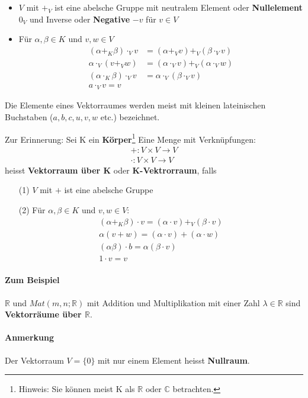 \documentclass[11pt]{report}
\newcommand*\Zb[1] {\mathbb{#1}}
\newcommand*\f[1] {\textbf{#1}}
\begin{document}
\begin{itemize}
 \item $V$ mit $+_V$ ist eine abelsche Gruppe mit neutralem Element oder \f{Nullelement} $0_V$ und Inverse oder \f{Negative} $-v$ für $v\in V$
 \item Für $\alpha, \beta \in K$ und $v, w \in V$
\begin{align}
 (\alpha+_K\beta)\cdot_V v &= (\alpha+_V v) +_V (\beta\cdot_V v) \\
 \alpha\cdot_V(v+_V w) &= (\alpha \cdot_V v)+_V (\alpha\cdot_V w) \\
 (\alpha\cdot_K \beta) \cdot_V v &= \alpha\cdot_V(\beta\cdot_V v) \\
 a \cdot_V v = v
\end{align}
\end{itemize}
Die Elemente eines Vektorraumes werden meist mit kleinen lateinischen Buchstaben ($a, b, c, u, v, w$ etc.) bezeichnet.

Zur Erinnerung: Sei K ein \f{Körper}\footnote{Hinweis: Sie können meist K als $\Zb{R}$ oder $\Zb{C}$ betrachten.} Eine Menge mit Verknüpfungen:
\begin{align}
 +: V \times V \rightarrow V \\
\cdot : V \times V \rightarrow V
\end{align}
heisst \f{Vektorraum über K} oder \f{K-Vektrorraum}, falls 
\begin{itemize}
 \item[(1)] $V$ mit $+$ ist eine abelsche Gruppe
 \item[(2)] Für $\alpha, \beta \in K$ und $v, w \in V$:
\begin{align}
 (\alpha +_K \beta)\cdot  v = (\alpha \cdot v) +_V (\beta \cdot v) \\
 \alpha (v+w) = (\alpha \cdot v) + (\alpha \cdot w) \\
(\alpha \beta) \cdot b = \alpha (\beta \cdot v) \\
1 \cdot v = v
\end{align}
\end{itemize}
\paragraph{Zum Beispiel} $\Zb{R}$ und $Mat(m, n; \Zb{R})$ mit Addition und Multiplikation mit einer Zahl $\lambda \in \Zb{R}$ sind \f{Vektorräume über $\Zb{R}$}.
\paragraph{Anmerkung} Der Vektorraum $V=\{0\}$ mit nur einem Element heisst \f{Nullraum}.
\end{document}
